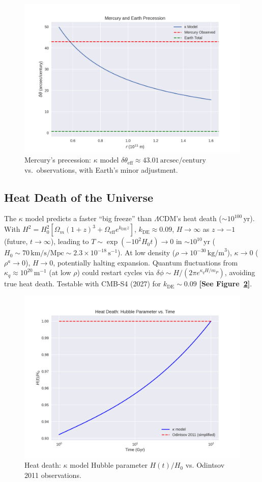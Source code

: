 \documentclass[a4paper,12pt]{article}
\begin{document}
\begin{figure}[H]
    \centering
    \includegraphics[width=0.7\linewidth]{figure14.png}
    \caption{Mercury’s precession: $\kappa$ model $\delta\theta_{\mathrm{eff}} \approx 43.01 \, \text{arcsec/century}$ vs.\ observations, with Earth’s minor adjustment.}
    \label{fig:14}
\end{figure}

\subsection{Heat Death of the Universe}
The $\kappa$ model predicts a faster “big freeze” than $\Lambda$CDM’s heat death ($\sim 10^{100} \, \text{yr}$). With $H^2 = H_0^2 [ \Omega_m (1+z)^3 + \Omega_\text{eff} e^{k_\text{DE} z} ]$, $k_\text{DE} \approx 0.09$, $H \to \infty$ as $z \to -1$ (future, $t \to \infty$), leading to $T \sim \exp(-10^2 H_0 t) \to 0$ in $\sim 10^{10} \, \text{yr}$ ($H_0 \sim 70 \, \text{km/s/Mpc} \sim 2.3 \times 10^{-18} \, \text{s}^{-1}$). At low density ($\rho \to 10^{-30} \, \text{kg/m}^3$), $\kappa \to 0$ ($\rho^a \to 0$), $H \to 0$, potentially halting expansion. Quantum fluctuations from $\kappa_q \approx 10^{20} \, \text{m}^{-1}$ (at low $\rho$) could restart cycles via $\delta\phi \sim H/(2\pi e^{\kappa_q H/m_P})$, avoiding true heat death. Testable with CMB-S4 (2027) for $k_\text{DE} \sim 0.09$ \citep{Odintsov2011} \textbf{[See Figure~\ref{fig:16}]}.

\begin{figure}[H]
    \centering
    \includegraphics[width=0.8\linewidth]{figure16.png}
    \caption{Heat death: $\kappa$ model Hubble parameter $H(t)/H_0$ vs. Odintsov 2011 observations.}
    \label{fig:16}
\end{figure}
\end{document}
